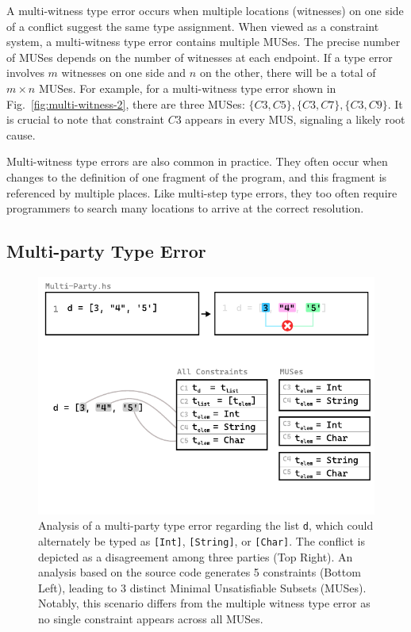 \documentclass[pdflatex,lineno,sn-nature,Numbered]{sn-jnl}%
\begin{document}
A multi-witness type error occurs when multiple locations (witnesses) on one side of a conflict suggest the same type assignment. When viewed as a constraint system, a multi-witness type error contains multiple MUSes. The precise number of MUSes depends on the number of witnesses at each endpoint. If a type error involves $m$ witnesses on one side and $n$ on the other, there will be a total of $m \times n$ MUSes. For example, for a multi-witness type error shown in Fig.~\ref{fig:multi-witness-2}, there are three MUSes: $\{C3, C5\}, \{C3, C7\}, \{C3, C9\}$. It is crucial to note that constraint $C3$ appears in every MUS, signaling a likely root cause.

Multi-witness type errors are also common in practice. They often occur when changes to the definition of one fragment of the program, and this fragment is referenced by multiple places. Like multi-step type errors, they too often require programmers to search many locations to arrive at the correct resolution.

\subsection{Multi-party Type Error} \label{sec:multi-party}

\begin{figure}[hbt]
  \centering
  \includegraphics[width=0.8\linewidth]{images/Multi-Party-MUS}
  \caption{\label{fig:multi-party-2} Analysis of a multi-party type error regarding the list \texttt{d}, which could alternately be typed as \texttt{[Int]}, \texttt{[String]}, or \texttt{[Char]}. The conflict is depicted as a disagreement among three parties (Top Right). An analysis based on the source code generates 5 constraints (Bottom Left), leading to 3 distinct Minimal Unsatisfiable Subsets (MUSes). Notably, this scenario differs from the multiple witness type error as no single constraint appears across all MUSes.}
  \end{figure}
\end{document}
